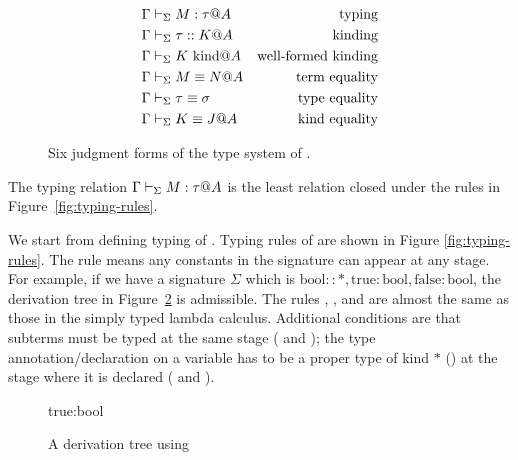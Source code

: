 \begin{figure}
	\begin{center}
		\begin{align*}
			\Gamma & \vdash_\Sigma M : \tau @ A   & \text{typing} \\
			\Gamma & \vdash_\Sigma \tau :: K @ A  & \text{kinding} \\
			\Gamma & \vdash_\Sigma K \text{\ kind} @ A  & \text{well-formed kinding} \\
			\Gamma & \vdash_\Sigma M \equiv N @ A     & \text{term equality} \\
			\Gamma & \vdash_\Sigma \tau \equiv \sigma & \text{type equality} \\
			\Gamma & \vdash_\Sigma K \equiv J @ A     & \text{kind equality}
		\end{align*}
		\caption{Six judgment forms of the type system of \LMD.}
		\label{fig:LMD-six-judgements}
	\end{center}
\end{figure}

\begin{definition}[Typing]
  The typing relation $ \Gamma \vdash_\Sigma M : \tau @ A $ is the least relation closed under the rules in Figure~\ref{fig:typing-rules}.
\end{definition}

  We start from defining typing of
\LMD.  Typing rules of \LMD are shown in Figure
\ref{fig:typing-rules}.  The rule \TConst{} means any constants in the
signature can appear at any stage.    For example, if we have a signature $\Sigma$ which is
$\textrm{bool} :: *, \textrm{true}: \textrm{bool}, \textrm{false}:
\textrm{bool}$, the derivation tree in
Figure~\ref{fig:tconst-derivation-tree} is admissible.    The rules \TVar,
\TAbs, and \TApp{} are almost the same as those in the simply typed
lambda calculus.    Additional conditions are that subterms must be
typed at the same stage (\TAbs{} and \TApp); the type
annotation/declaration on a variable has to be a proper type of kind
$*$ (\TAbs) at the stage where it is declared (\TVar{} and \TAbs).

\begin{figure}
	\begin{center}
		\begin{minipage}{0.50\hsize}
			{\textrm{true}:\textrm{bool} \in \Sigma \andalso
				 \andalso
			}
			\caption{A derivation tree using \TConst}
			\label{fig:tconst-derivation-tree}
		\end{minipage}
	\end{center}
\end{figure}



